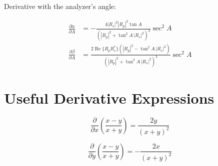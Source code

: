 \documentclass{article}
\begin{document}
Derivative with the analyzer's angle:

\begin{align}
\frac{\partial \alpha}{\partial A} & = - \frac{4 |R_s|^2 |R_p|^2 \tan A}{\left( |R_p|^2 + \tan^2 A \, |R_s|^2 \right)^2} \sec^2 A \\
\frac{\partial \beta}{\partial A} & = \frac{2 \operatorname{Re}\{R_p R_s^\ast\} \left(|R_p|^2 - \tan^2 A \, |R_s|^2\right)}{\left( |R_p|^2 + \tan^2 A \, |R_s|^2 \right)^2} \sec^2 A
\end{align}

\section{Useful Derivative Expressions}
\begin{equation*}
    \frac{\partial}{\partial x} \left( \frac{x-y}{x+y}\right) = \frac{2 y}{(x+y)^2}
\end{equation*}

\begin{equation*}
    \frac{\partial}{\partial y} \left( \frac{x-y}{x+y}\right) = - \frac{2 x}{(x+y)^2}
\end{equation*}
\end{document}
